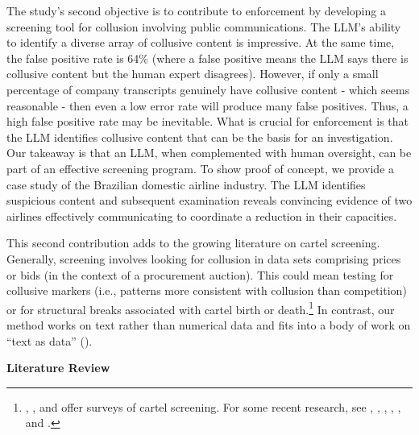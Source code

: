 The study's second objective is to contribute to enforcement by developing a 
screening tool for collusion involving public communications. The LLM's 
ability to identify a diverse array of collusive content is impressive. At 
the same time, the false positive rate is 64\% (where a false positive means 
the LLM says there is collusive content but the human expert disagrees). 
However, if only a small percentage of company transcripts genuinely have 
collusive content - which seems reasonable - then even a low error rate will 
produce many false positives. Thus, a high false positive rate may 
be inevitable. What is crucial for enforcement is that the LLM identifies 
collusive content that can be the basis for an investigation. Our takeaway is that 
an LLM, when complemented with human oversight, can be part of an effective 
screening program. To show proof of concept, we provide a case study of the 
Brazilian domestic airline industry. The LLM identifies suspicious content 
and subsequent examination reveals convincing evidence of two airlines 
effectively communicating to coordinate a reduction in their capacities.

This second contribution adds to the growing literature on 
cartel screening. Generally, screening involves looking for collusion
in data sets comprising prices or bids (in the context of a procurement
auction). This could mean testing for collusive markers (i.e., patterns more
consistent with collusion than competition) or for structural breaks
associated with cartel birth or death.\footnote{%
\textcite{harrington2008detecting}, \textcite{harringtonimhof2022cartel}, and
\textcite{oecd2024detecting} offer surveys of cartel screening. For some
recent research, see \textcite{huberimhof2019machine},
\textcite{kawai2022detecting}, \textcite{chassang2022robust},
\textcite{kawai2023bidrotation}, \textcite{silveira2023who}, and
\textcite{aaltio2025complementary}.} In contrast, our method works on text
rather than numerical data and fits into a body of work on ``text as data''
(\textcite{gentzkow2019text}).

\medskip

\textbf{Literature Review }

